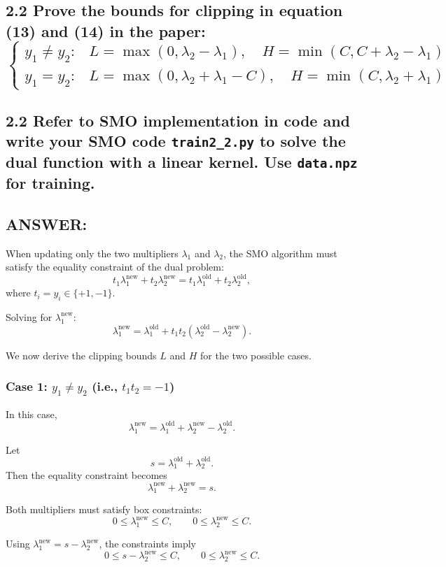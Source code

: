 \documentclass[12pt]{article}
\begin{document}
\subsection*{2.2
Prove the bounds for clipping in equation (13) and (14) in the paper:
\[
\begin{cases}
y_1 \neq y_2: & L = \max(0, \lambda_2 - \lambda_1), \quad H = \min(C, C + \lambda_2 - \lambda_1)\\[0.3em]
y_1 = y_2:   & L = \max(0, \lambda_2 + \lambda_1 - C), \quad H = \min(C, \lambda_2 + \lambda_1)
\end{cases}
\]}
\subsection*{2.2
Refer to SMO implementation in code and write your SMO code \texttt{train2\_2.py} to solve the dual function with a linear kernel. Use \texttt{data.npz} for training.}
\subsection*{ANSWER:}
When updating only the two multipliers $\lambda_1$ and $\lambda_2$, the SMO algorithm
must satisfy the equality constraint of the dual problem:
\[
t_1 \lambda_1^{\text{new}} + t_2 \lambda_2^{\text{new}}
=
t_1 \lambda_1^{\text{old}} + t_2 \lambda_2^{\text{old}},
\]
where $t_i = y_i \in \{+1,-1\}$.

Solving for $\lambda_1^{\text{new}}$:
\[
\lambda_1^{\text{new}}
=
\lambda_1^{\text{old}}
+
t_1 t_2(\lambda_2^{\text{old}} - \lambda_2^{\text{new}}).
\]

We now derive the clipping bounds $L$ and $H$ for the two possible cases.

\subsubsection*{Case 1: $y_1 \neq y_2$ (i.e., $t_1 t_2 = -1$)}
In this case,
\[
\lambda_1^{\text{new}}
=
\lambda_1^{\text{old}} + \lambda_2^{\text{new}} - \lambda_2^{\text{old}}.
\]

Let
\[
s = \lambda_1^{\text{old}} + \lambda_2^{\text{old}}.
\]
Then the equality constraint becomes
\[
\lambda_1^{\text{new}} + \lambda_2^{\text{new}} = s.
\]

Both multipliers must satisfy box constraints:
\[
0 \le \lambda_1^{\text{new}} \le C,
\qquad
0 \le \lambda_2^{\text{new}} \le C.
\]

Using $\lambda_1^{\text{new}} = s - \lambda_2^{\text{new}}$, the constraints imply
\[
0 \le s - \lambda_2^{\text{new}} \le C,
\qquad
0 \le \lambda_2^{\text{new}} \le C.
\]
\end{document}
